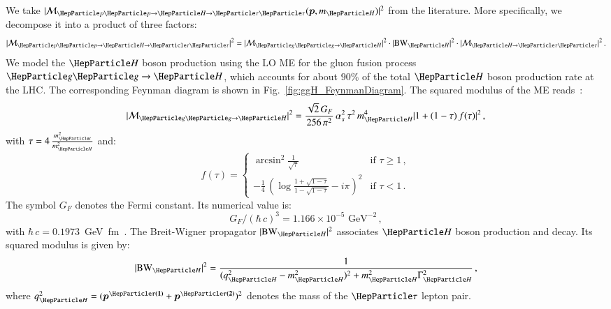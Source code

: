 We take $\vert \mathcal{M}_{\Pp\Pp \to \PHiggs \to
  \Pgt\Pgt}(\bm{p},m_{\PHiggs}) \vert^{2}$ from the literature.
More specifically, we decompose it into a product of three factors:
\begin{equation}
\vert \mathcal{M}_{\Pp\Pp \to \PHiggs \to \Pgt\Pgt} \vert^{2} =
 \vert \mathcal{M}_{\Pg\Pg \to \PHiggs} \vert^{2} 
\cdot \vert \BW_{\PHiggs} \vert^{2} 
\cdot \vert \mathcal{M}_{\PHiggs \to \Pgt\Pgt} \vert^{2} \, .
\label{eq:meHiggsProduction_and_Decay}
\end{equation}
We model the $\PHiggs$ boson production using the LO ME for the gluon fusion process $\Pg\Pg \to \PHiggs$,
which accounts for about $90\%$ of the total $\PHiggs$ boson production rate at the LHC.
The corresponding Feynman diagram is shown in Fig.~\ref{fig:ggH_FeynmanDiagram}.
The squared modulus of the ME reads~\cite{me_ggHprod}:
\begin{equation}
\vert \mathcal{M}_{\Pg\Pg \to \PHiggs} \vert^{2} = 
 \frac{\sqrt{2} \, G_{F}}{256 \, \pi^{2}} \, \alpha_{s}^{2} \, \tau^{2} \, m_{\PHiggs}^{4} \vert 1 + (1 - \tau) \, f(\tau) \vert^{2} \, ,
\label{eq:meHiggsProduction}
\end{equation}
with $\tau = 4\, \frac{m_{\Pqt}^{2}}{m_{\PHiggs}^{2}}$ and:
\begin{equation}
f(\tau) = 
\begin{cases} 
\arcsin^{2} \frac{1}{\sqrt{\tau}}  & \mbox{if } \tau \geq 1 \, , \\
-\frac{1}{4} \, \left( \log\frac{1 + \sqrt{1 - \tau}}{1 - \sqrt{1 - \tau}} - i\pi \right)^{2} & \mbox{if } \tau < 1 \, .
\end{cases}
\label{eq:meHiggsProduction_ftau}
\end{equation}
The symbol $G_{F}$ denotes the Fermi constant. Its numerical value is:
\begin{equation} 
G_{F}/(\hbar \, c)^3 = 1.166 \times 10^{-5}\mbox{~GeV}^{-2} \, ,
\label{eq:def_G_F} 
\end{equation}
with $\hbar \, c = 0.1973$~GeV~fm~\cite{PDG}.
The Breit-Wigner propagator $\vert \BW_{\PHiggs} \vert^{2}$ associates $\PHiggs$ boson production and decay.
Its squared modulus is given by:
\begin{equation}
\vert \BW_{\PHiggs} \vert^{2} = \frac{1}{(q_{\PHiggs}^{2} -
  m_{\PHiggs}^{2})^{2} + m_{\PHiggs}^{2}\Gamma_{\PHiggs}^{2}} \, ,
\label{eq:meHiggsBreitWigner}
\end{equation}
where $q_{\PHiggs}^{2} = (\bm{p^{\Pgt(1)}} + \bm{p^{\Pgt(2)}})^{2}$ denotes the mass of the $\Pgt$ lepton pair.
